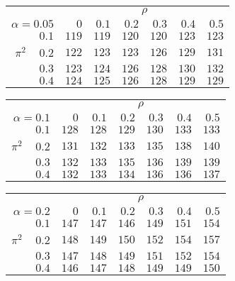 \begin{tabular}{r|rrrrrr}
\hline\hline
 &\multicolumn{6}{c}{$\rho$} \\ 
 $\alpha = 0.05$ & $0$ & $0.1$ & $0.2$ & $0.3$ & $0.4$ & $0.5$ \\ 
 \hline$0.1$ & $119$ & $119$ & $120$ & $120$ & $123$ & $123$\\ 
$\pi^2\;\;\;$ $0.2$ & $122$ & $123$ & $123$ & $126$ & $129$ & $131$\\ 
$0.3$ & $123$ & $124$ & $126$ & $128$ & $130$ & $132$\\ 
$0.4$ & $124$ & $125$ & $126$ & $128$ & $129$ & $129$\\ 
 \hline 
 \end{tabular}
 
 \vspace{2em} 
 
\begin{tabular}{r|rrrrrr}
\hline\hline
 &\multicolumn{6}{c}{$\rho$} \\ 
 $\alpha = 0.1$ & $0$ & $0.1$ & $0.2$ & $0.3$ & $0.4$ & $0.5$ \\ 
 \hline$0.1$ & $128$ & $128$ & $129$ & $130$ & $133$ & $133$\\ 
$\pi^2\;\;\;$ $0.2$ & $131$ & $132$ & $133$ & $135$ & $138$ & $140$\\ 
$0.3$ & $132$ & $133$ & $135$ & $136$ & $139$ & $139$\\ 
$0.4$ & $132$ & $133$ & $134$ & $136$ & $136$ & $137$\\ 
 \hline 
 \end{tabular}
 
 \vspace{2em} 
 
\begin{tabular}{r|rrrrrr}
\hline\hline
 &\multicolumn{6}{c}{$\rho$} \\ 
 $\alpha = 0.2$ & $0$ & $0.1$ & $0.2$ & $0.3$ & $0.4$ & $0.5$ \\ 
 \hline$0.1$ & $147$ & $147$ & $146$ & $149$ & $151$ & $154$\\ 
$\pi^2\;\;\;$ $0.2$ & $148$ & $149$ & $150$ & $152$ & $154$ & $157$\\ 
$0.3$ & $147$ & $148$ & $149$ & $151$ & $152$ & $154$\\ 
$0.4$ & $146$ & $147$ & $148$ & $149$ & $149$ & $150$\\ 
 \hline 
 \end{tabular}